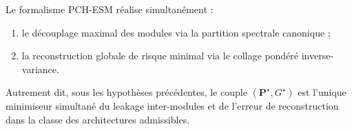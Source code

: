 \begin{corollary}
Le formalisme PCH-ESM réalise simultanément :
\begin{enumerate}[leftmargin=2em]
    \item le découplage maximal des modules via la partition spectrale canonique ;
    \item la reconstruction globale de risque minimal via le collage pondéré inverse-variance.
\end{enumerate}
Autrement dit, sous les hypothèses précédentes, le couple \((\mathbf P^\star,G^\star)\) est l'unique minimiseur simultané du leakage inter-modules et de l'erreur de reconstruction dans la classe des architectures admissibles.
\end{corollary}